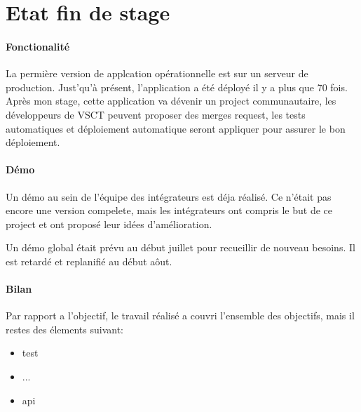 \section{Etat fin de stage}

\paragraph{Fonctionalité}
La permière version de applcation opérationnelle est sur un serveur de production.
Just'qu'à présent, l'application a été déployé il y a plus que 70 fois.
Après mon stage, cette application va dévenir un project communautaire,
les développeurs de VSCT peuvent proposer des merges request,
les tests automatiques et déploiement automatique seront appliquer pour assurer le bon déploiement.

\paragraph{Démo}
Un démo au sein de l'équipe des intégrateurs est déja réalisé.
Ce n'était pas encore une version compelete, mais les intégrateurs ont compris le but de ce project et ont proposé leur idées d'amélioration.

Un démo global était prévu au début juillet pour recueillir de nouveau besoins. Il est retardé et replanifié au début aôut.

\paragraph{Bilan}
Par rapport a l'objectif, le travail réalisé a couvri l'ensemble des objectifs, mais il restes des élements suivant:
\begin{itemize}
  \item test
  \item ...
  \item api
\end{itemize}

\clearpage
